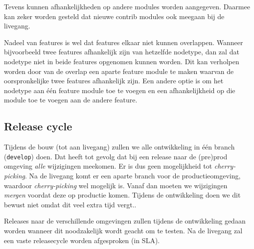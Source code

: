 Tevens kunnen afhankelijkheden op andere modules worden aangegeven. Daarmee kan zeker worden gesteld dat nieuwe contrib modules ook meegaan bij de livegang.

Nadeel van features is wel dat features elkaar niet kunnen overlappen. Wanneer bijvoorbeeld twee features afhankelijk zijn van hetzelfde nodetype, dan zal dat nodetype niet in beide features opgenomen kunnen worden. Dit kan verholpen worden door van de overlap een aparte feature module te maken waarvan de oorspronkelijke twee features afhankelijk zijn. Een andere optie is om het nodetype aan \'{e}\'{e}n feature module toe te voegen en een afhankelijkheid op die module toe te voegen aan de andere feature.

\subsection{Release cycle}

Tijdens de bouw (tot aan livegang) zullen we alle ontwikkeling in \'{e}\'{e}n branch (\texttt{develop}) doen. Dat heeft tot gevolg dat bij een release naar de (pre)prod omgeving \emph{alle} wijzigingen meekomen. Er is dus geen mogelijkheid tot \emph{cherry-picking}.
Na de livegang komt er een aparte branch voor de productieomgeving, waardoor \emph{cherry-picking} wel mogelijk is. Vanaf dan moeten we wijzigingen \emph{mergen} voordat deze op productie komen. Tijdens de ontwikkeling doen we dit bewust niet omdat dit veel extra tijd vergt..

Releases naar de verschillende omgevingen zullen tijdens de ontwikkeling gedaan worden wanneer dit noodzakelijk wordt geacht om te testen. Na de livegang zal een vaste releasecycle worden afgesproken (in SLA).


